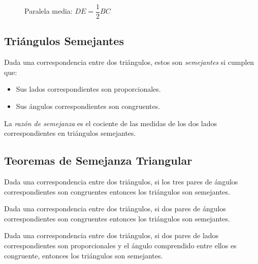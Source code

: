 \begin{figure}[!h]
    \centering
    
    \caption{Paralela media: $DE = \dfrac{1}{2}BC$}
    \label{fig:paralela-media}
\end{figure}    

\subsection{Triángulos Semejantes}

\begin{definition}
    Dada una correspondencia entre dos triángulos, estos son \textit{semejantes} si cumplen que:

    \begin{itemize}
        \item Sus lados correspondientes son proporcionales.
        \item Sus ángulos correspondientes son congruentes.
    \end{itemize}
    
\end{definition}

\begin{definition}
    La \textit{razón de semejanza} es el cociente de las medidas de los dos lados correspondientes en triángulos semejantes.
\end{definition}


\subsection{Teoremas de Semejanza Triangular}

\begin{theorem}
    Dada una correspondencia entre dos triángulos, si los tres pares de ángulos correspondientes son congruentes entonces los triángulos son semejantes.
\end{theorem}


\begin{theorem}
    Dada una correspondencia entre dos triángulos, si dos pares de ángulos correspondientes son congruentes entonces los triángulos son semejantes.
\end{theorem}


\begin{theorem}
    Dada una correspondencia entre dos triángulos, si dos pares de lados correspondientes son proporcionales y el ángulo comprendido entre ellos es congruente, entonces los triángulos son semejantes.
\end{theorem}

